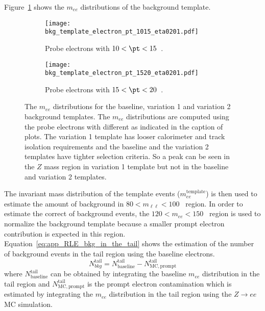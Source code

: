 Figure~\ref{fig:app_RLE_bkg_templates} shows the $m_{ee}$ distributions of the background template.
%
\begin{figure}[ht]
    \begin{subfigure}[b]{0.48\textwidth}
        \begin{center}
            \texttt{[image: bkg\_template\_electron\_pt\_1015\_eta0201.pdf]}
            \caption{Probe electrons with $10 < \pt < 15$~{\GeV}.}
        \end{center}
    \end{subfigure}
    \begin{subfigure}[b]{0.48\textwidth}
        \begin{center}
            \texttt{[image: bkg\_template\_electron\_pt\_1520\_eta0201.pdf]}
            \caption{Probe electrons with $15 < \pt < 20$~{\GeV}.}
        \end{center}
    \end{subfigure}
    \caption{The $m_{ee}$ distributions for the baseline, variation 1 and variation 2 background templates.
    The $m_{ee}$ distributions are computed using the probe electrons with different \pt as indicated in the caption of plots.
    The variation 1 template has looser calorimeter and track isolation requirements and the baseline and the variation 2 templates have tighter selection criteria.
    So a peak can be seen in the $Z$ mass region in variation 1 template but not in the baseline and variation 2 templates.}
    \label{fig:app_RLE_bkg_templates}
\end{figure}
%
The invariant mass distribution of the template events ($m_{ee}^\mathrm{template}$) is then used to estimate the amount of background in $80 < m_{\ell \ell} < 100$~{\GeV} region.
In order to estimate the correct of background events, the $120 < m_{ee} < 150$~{\GeV} region is used to normalize the background template because a smaller prompt electron contribution is expected in this region.
Equation~\ref{eq:app_RLE_bkg_in_the_tail} shows the estimation of the number of background events in the tail region using the baseline electrons.
%
\begin{equation}
    N_{bkg}^\mathrm{tail} = N_\mathrm{baseline}^\mathrm{tail} - N_\mathrm{MC, prompt}^\mathrm{tail}
    \label{eq:app_RLE_bkg_in_the_tail}
\end{equation}
%
where $N_\mathrm{baseline}^\mathrm{tail}$ can be obtained by integrating the baseline $m_{ee}$ distribution in the tail region and $N_\mathrm{MC, prompt}^\mathrm{tail}$ is the prompt electron contamination which is estimated by integrating the $m_{ee}$ distribution in the tail region using the $Z \to ee$ MC simulation.
